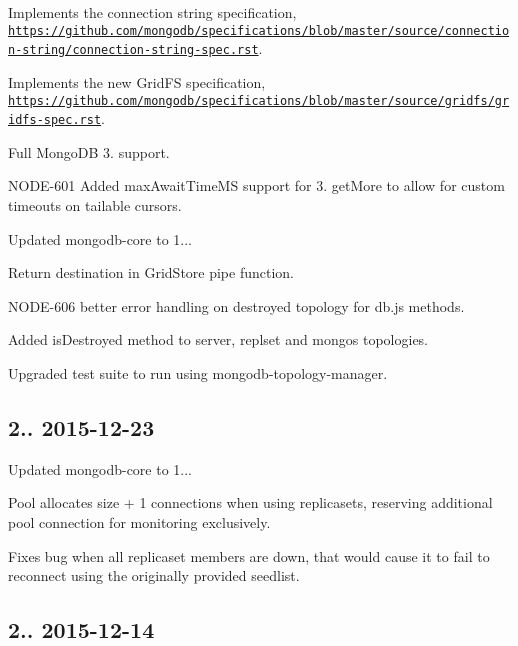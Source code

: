 \begin{DoxyItemize}
\item Implements the connection string specification, \href{https://github.com/mongodb/specifications/blob/master/source/connection-string/connection-string-spec.rst}{\tt https\+://github.\+com/mongodb/specifications/blob/master/source/connection-\/string/connection-\/string-\/spec.\+rst}.
\item Implements the new Grid\+FS specification, \href{https://github.com/mongodb/specifications/blob/master/source/gridfs/gridfs-spec.rst}{\tt https\+://github.\+com/mongodb/specifications/blob/master/source/gridfs/gridfs-\/spec.\+rst}.
\item Full Mongo\+DB 3. support.
\item N\+O\+D\+E-\/601 Added max\+Await\+Time\+MS support for 3. get\+More to allow for custom timeouts on tailable cursors.
\item Updated mongodb-\/core to 1...
\item Return destination in Grid\+Store pipe function.
\item N\+O\+D\+E-\/606 better error handling on destroyed topology for db.\+js methods.
\item Added is\+Destroyed method to server, replset and mongos topologies.
\item Upgraded test suite to run using mongodb-\/topology-\/manager.
\end{DoxyItemize}

\subsection*{2.. 2015-\/12-\/23 }


\begin{DoxyItemize}
\item Updated mongodb-\/core to 1...
\item Pool allocates size + 1 connections when using replicasets, reserving additional pool connection for monitoring exclusively.
\item Fixes bug when all replicaset members are down, that would cause it to fail to reconnect using the originally provided seedlist.
\end{DoxyItemize}

\subsection*{2.. 2015-\/12-\/14 }


